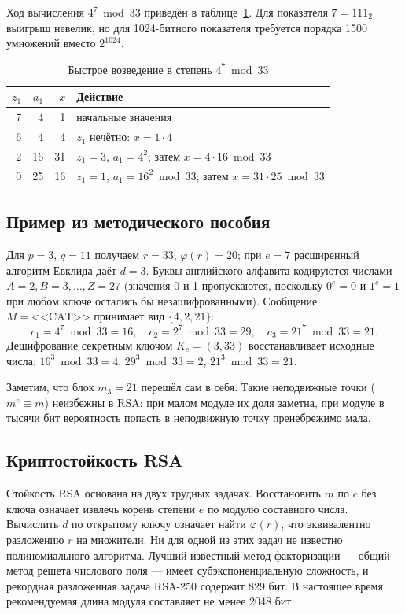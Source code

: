 \documentclass[14pt,a4paper]{extarticle}
\begin{document}
Ход вычисления $4^7 \bmod 33$ приведён в таблице~\ref{tab:exp}. Для показателя
$7 = 111_2$ выигрыш невелик, но для 1024-битного показателя требуется порядка
1500 умножений вместо $2^{1024}$.

\begin{table}[H]
\caption{Быстрое возведение в степень $4^7 \bmod 33$}
\label{tab:exp}
\centering
\begin{tabular}{rrrl}
\toprule
$z_1$ & $a_1$ & $x$ & Действие \\
\midrule
7 & 4 & 1 & начальные значения \\
6 & 4 & 4 & $z_1$ нечётно: $x = 1 \cdot 4$ \\
2 & 16 & 31 & $z_1 = 3$, $a_1 = 4^2$; затем $x = 4 \cdot 16 \bmod 33$ \\
0 & 25 & 16 & $z_1 = 1$, $a_1 = 16^2 \bmod 33$; затем $x = 31 \cdot 25 \bmod 33$ \\
\bottomrule
\end{tabular}
\end{table}

\subsection{Пример из методического пособия}

Для $p = 3$, $q = 11$ получаем $r = 33$, $\varphi(r) = 20$; при $e = 7$ расширенный
алгоритм Евклида даёт $d = 3$. Буквы английского алфавита кодируются числами
$A = 2, B = 3, \dots, Z = 27$ (значения 0 и 1 пропускаются, поскольку $0^e = 0$ и
$1^e = 1$ при любом ключе остались бы незашифрованными). Сообщение
$M = \text{<<CAT>>}$ принимает вид $\{4, 2, 21\}$:
\begin{equation*}
c_1 = 4^7 \bmod 33 = 16, \quad c_2 = 2^7 \bmod 33 = 29, \quad c_3 = 21^7 \bmod 33 = 21.
\end{equation*}
Дешифрование секретным ключом $K_c = (3, 33)$ восстанавливает исходные числа:
$16^3 \bmod 33 = 4$, $29^3 \bmod 33 = 2$, $21^3 \bmod 33 = 21$.

Заметим, что блок $m_3 = 21$ перешёл сам в себя. Такие неподвижные точки
($m^e \equiv m$) неизбежны в RSA; при малом модуле их доля заметна, при модуле
в тысячи бит вероятность попасть в неподвижную точку пренебрежимо мала.

\subsection{Криптостойкость RSA}

Стойкость RSA основана на двух трудных задачах. Восстановить $m$ по $c$ без ключа
означает извлечь корень степени $e$ по модулю составного числа. Вычислить $d$ по
открытому ключу означает найти $\varphi(r)$, что эквивалентно разложению $r$ на
множители. Ни для одной из этих задач не известно полиномиального алгоритма. Лучший
известный метод факторизации --- общий метод решета числового поля --- имеет
субэкспоненциальную сложность, и рекордная разложенная задача RSA-250 содержит
829 бит. В настоящее время рекомендуемая длина модуля составляет не менее 2048 бит.
\end{document}
